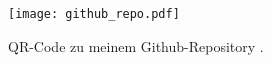 \documentclass[parskip=full]{scrreprt}
\title{\maTitle}
\author{Nelio Gautschi\vspace{1cm}\\
Betreut durch \\
Stefan Rothe}
\begin{document}
\maketitle

\tableofcontents







\listoffigures
\listoftables

\printbibliography

\begin{figure}[H]
    \centering
        \texttt{[image: github\_repo.pdf]}
    \caption{QR-Code zu meinem Github-Repository \cite{git:repo}.}
        \label{qr:github}
\end{figure}
\end{document}
